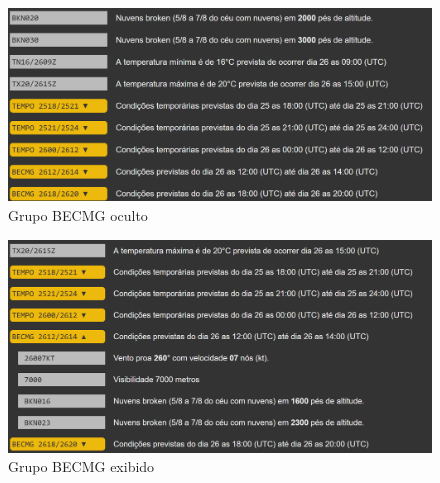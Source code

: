 \begin{figure}[ht]
    \begin{center}
    \includegraphics[width=400pt]{img/BECMG-oculto.png}
    \caption{Grupo BECMG oculto}
    \label{fig:becmg-oculto}
    \end{center}
\end{figure}

\begin{figure}[ht]
    \begin{center}
    \includegraphics[width=400pt]{img/BECMG-exibido.png}
    \caption{Grupo BECMG exibido}
    \label{fig:becmg-exibido}
    \end{center}
\end{figure}


